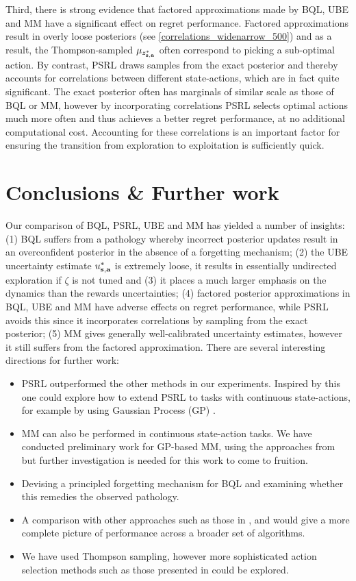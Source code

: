 \documentclass{article}
\begin{document}
Third, there is strong evidence that factored approximations made by BQL, UBE and MM have a significant effect on regret performance. Factored approximations result in overly loose posteriors (see \cref{correlations_widenarrow_500}) and as a result, the Thompson-sampled $\mu_{z^*_{\mathbf{s}, \mathbf{a}}}$ often correspond to picking a sub-optimal action. By contrast, PSRL draws samples from the exact posterior and thereby accounts for correlations between different state-actions, which are in fact quite significant. The exact posterior often has marginals of similar scale as those of BQL or MM, however by incorporating correlations PSRL selects optimal actions much more often and thus achieves a better regret performance, at no additional computational cost. Accounting for these correlations is an important factor for ensuring the transition from exploration to exploitation is sufficiently quick.

\section{Conclusions \& Further work}

Our comparison of BQL, PSRL, UBE and MM has yielded a number of insights: (1) BQL suffers from a pathology whereby incorrect posterior updates result in an overconfident posterior in the absence of a forgetting mechanism; (2) the UBE uncertainty estimate $u^*_{\mathbf{s}, \mathbf{a}}$ is extremely loose, it results in essentially undirected exploration if $\zeta$ is not tuned and (3) it places a much larger emphasis on the dynamics than the rewards uncertainties; (4) factored posterior approximations in BQL, UBE and MM have adverse effects on regret performance, while PSRL avoids this since it incorporates correlations by sampling from the exact posterior; (5) MM gives generally well-calibrated uncertainty estimates, however it still suffers from the factored approximation. There are several interesting directions for further work:
\begin{itemize}
\item PSRL outperformed the other methods in our experiments. Inspired by this one could explore how to extend PSRL to tasks with continuous state-actions, for example by using Gaussian Process (GP) \citep{gps_textbook}.
\item MM can also be performed in continuous state-action tasks. We have conducted preliminary work for GP-based MM, using the approaches from \cite{gpsinrl, quintechrep} but further investigation is needed for this work to come to fruition.
\item Devising a principled forgetting mechanism for BQL and examining whether this remedies the observed pathology.
\item A comparison with other approaches such as those in \cite{bdqn}, \cite{su} and \cite{rlvi} would give a more complete picture of performance across a broader set of algorithms.
\item We have used Thompson sampling, however more sophisticated action selection methods such as those presented in \cite{bqlearning} could be explored.
\end{itemize}
\end{document}
